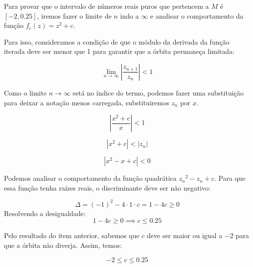 \begin{enumerate}[label=(\alph*)]
        Para provar que o intervalo de números reais puros que pertencem a \( M \) é \( [-2, 0.25] \), iremos fazer o limite de \( n \) indo a \( \infty \) e analisar o comportamento da função \( f_c(z) = z^2 + c \).

        Para isso, consideramos a condição de que o módulo da derivada da função iterada deve ser menor que 1 para garantir que a órbita permaneça limitada:

        \[
        \lim_{n \to \infty} \left| \frac{z_{n+1}}{z_n} \right| < 1
        \]

        Como o limite \(n \to \infty\) está no índice do termo, podemos fazer uma substituição para deixar a notação menos carregada, substituiremos \(z_n\) por \(x\).

        \[
        \left| \frac{x^2 + c}x \right| < 1
        \]

        \[
        \left| x^2 + c \right| < \left| z_n \right| 
        \]

        \[
        \left| x^2  -x + c \right| < 0
        \]

        Podemos analisar o comportamento da função quadrática \( {z_n}^2 - z_n + c \). Para que essa função tenha raízes reais, o discriminante deve ser não negativo:

        \[
        \Delta = (-1)^2 - 4 \cdot 1 \cdot
        c = 1 - 4c \geq 0
        \]
        Resolvendo a desigualdade:
        \[
        1 - 4c \geq 0 \implies c \leq 0.25
        \]


        Pelo resultado do item anterior, sabemos que \( c \) deve ser maior ou igual a \( -2 \) para que a órbita não diverja. Assim, temos:

        \[
        -2 \leq c \leq 0.25
        \]
    \end{enumerate}